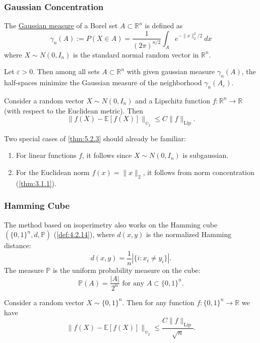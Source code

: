 \subsubsection{Gaussian Concentration}
The \underline{Gaussian measure} of a Borel set $A \subset \mathbb{R}^n$ is defined as 
\[ \gamma_n(A) := P(X \in A) = \frac{1}{(2 \pi)^{n / 2}} \int_{A}^{} e^{-\lVert x \rVert_{2}^2 / 2} \ dx \]
where $X \sim N(0, I_n)$ is the standard normal random vector in $\mathbb{R}^n$.

\begin{theorem}
\label{thm:5.2.2}
Let $\varepsilon > 0$. Then among all sets $A \subset \mathbb{R}^n$ with given gaussian measure $\gamma_n(A)$, 
the half-spaces minimize the Gaussian measure of the neighborhood $\gamma_n(A_{\varepsilon})$.
\end{theorem}

\begin{theorem}
\label{thm:5.2.3}
Consider a random vector $X \sim N(0, I_n)$ and a Lipschitz function $f: \mathbb{R}^n \to \mathbb{R}$ (with 
respect to the Euclidean metric). Then 
\[ \lVert f(X) - \mathbb{E}[f(X)] \rVert_{\psi_2} \leq C \lVert f \rVert_{\mathrm{Lip}}. \]
\end{theorem}

\begin{example}[]
\label{ex:5.2.4}
Two special cases of \cref{thm:5.2.3} should already be familiar: 
\begin{enumerate}
	\item For linear functions $f$, it follows since $X \sim N(0, I_n)$ is subgaussian.
	\item For the Euclidean norm $f(x) = \lVert x \rVert_{2}$, it follows from norm concentration 
	(\cref{thm:3.1.1}).
\end{enumerate}
\end{example}


\subsubsection{Hamming Cube}
The method based on isoperimetry also works on the Hamming cube $(\{0, 1\}^n, d, \mathbb{P})$ 
(\cref{def:4.2.14}), where $d(x, y)$ is the normalized Hamming distance:
\[ d(x, y) = \frac{1}{n}|\{i: x_i \neq y_i\}|. \]
The measure $\mathbb{P}$ is the uniform probability measure on the cube: 
\[ \mathbb{P}(A) = \frac{|A|}{2^n} \text{ for any } A \subset \{0, 1\}^n. \]

\begin{theorem}
\label{ex:5.2.5}
Consider a random vector $X \sim \{0, 1\}^n$. Then for any function $f: \{0, 1\}^n \to \mathbb{R}$ we have 
\[ \lVert f(X) - \mathbb{E}[f(X)] \rVert_{\psi_2} \leq \frac{C \lVert f \rVert_{\mathrm{Lip}}}{\sqrt{n}}. \]
\end{theorem}


